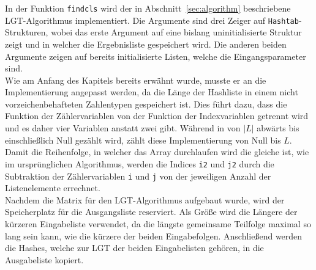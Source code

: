 \documentclass[a4paper,titlepage,12pt]{scrartcl}
\begin{document}
In der Funktion \texttt{findcls} wird der in Abschnitt~\ref{sec:algorithm} beschriebene LGT-Algorithmus implementiert.
Die Argumente sind drei Zeiger auf \texttt{Hashtab}-Strukturen,
wobei das erste Argument auf eine bislang uninitialisierte Struktur zeigt und in welcher die Ergebnisliste gespeichert wird.
Die anderen beiden Argumente zeigen auf bereits initialisierte Listen,
welche die Eingangsparameter sind.
\\
Wie am Anfang des Kapitels bereits erwähnt wurde,
musste er an die Implementierung angepasst werden,
da die Länge der Hashliste in einem nicht vorzeichenbehafteten Zahlentypen gespeichert ist.
Dies führt dazu,
dass die Funktion der Zählervariablen von der Funktion der Indexvariablen getrennt wird und es daher vier Variablen anstatt zwei gibt.
Während in \citet{web:eppstein} von $|L|$ abwärts bis einschließlich Null gezählt wird,
zählt diese Implementierung von Null bis $L$.
Damit die Reihenfolge,
in welcher das Array durchlaufen wird die gleiche ist,
wie im ursprünglichen Algorithmus,
werden die Indices \texttt{i2} und \texttt{j2} durch die Subtraktion der Zählervariablen \texttt{i} und \texttt{j} von der jeweiligen Anzahl der Listenelemente errechnet.
\\
Nachdem die Matrix für den LGT-Algorithmus aufgebaut wurde,
wird der Speicherplatz für die Ausgangsliste reserviert.
Als Größe wird die Längere der kürzeren Eingabeliste verwendet,
da die längste gemeinsame Teilfolge maximal so lang sein kann,
wie die kürzere der beiden Eingabefolgen.
Anschließend werden die Hashes,
welche zur LGT der beiden Eingabelisten gehören,
in die Ausgabeliste kopiert.
\end{document}
